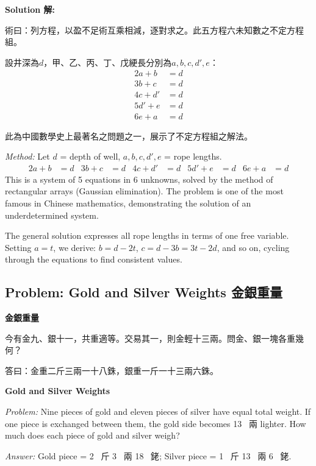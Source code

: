 \documentclass[11pt,a4paper]{article}
\newcommand{\zh}[1]{{\CJKfamily{\CJKrmdefault} #1}}
\newenvironment{chside}{%
  \begin{minipage}[t]{0.48\textwidth}%
  \setlength{\parindent}{1.5em}%
  \linespread{1.25}\selectfont%
  \small%
}{%
  \end{minipage}%
}
\newenvironment{enside}{%
  \hfill\begin{minipage}[t]{0.48\textwidth}%
  \setlength{\parindent}{1em}%
  \linespread{1.15}\selectfont%
  \small%
}{%
  \end{minipage}%
}
\newenvironment{solution}{%
  \par\medskip\noindent\textbf{\textcolor{notecolor}{Solution \zh{解}:}}\par\nopagebreak
  \small\setlength{\parindent}{1em}%
}{%
  \par\medskip%
}
\begin{document}
\begin{solution}
\noindent\begin{chside}
\zh{術曰：列方程，以盈不足術互乘相減，逐對求之。此五方程六未知數之不定方程組。}

設井深為$d$，甲、乙、丙、丁、戊綆長分別為$a, b, c, d', e$：
\begin{align*}
2a + b &= d \\
3b + c &= d \\
4c + d' &= d \\
5d' + e &= d \\
6e + a &= d
\end{align*}

此為中國數學史上最著名之問題之一，展示了不定方程組之解法。
\end{chside}%
\begin{enside}
\textit{Method:} Let $d$ = depth of well, $a, b, c, d', e$ = rope lengths.
\begin{align*}
2a + b &= d & 3b + c &= d & 4c + d' &= d & 5d' + e &= d & 6e + a &= d
\end{align*}
This is a system of 5 equations in 6 unknowns, solved by the method of
rectangular arrays (Gaussian elimination). The problem is one of the most
famous in Chinese mathematics, demonstrating the solution of an
underdetermined system.

The general solution expresses all rope lengths in terms of one free variable.
Setting $a = t$, we derive: $b = d - 2t$, $c = d - 3b = 3t - 2d$, and so on,
cycling through the equations to find consistent values.
\end{enside}
\end{solution}

\subsection{Problem: Gold and Silver Weights \zh{金銀重量}}

\noindent\begin{chside}
\noindent\textbf{金銀重量}

\zh{今有金九、銀十一，共重適等。交易其一，則金輕十三兩。問金、銀一塊各重幾何？}

\medskip
\zh{答曰：金重二斤三兩一十八銖，銀重一斤一十三兩六銖。}
\end{chside}%
\begin{enside}
\noindent\textbf{Gold and Silver Weights}

\textit{Problem:} Nine pieces of gold and eleven pieces of silver have equal
total weight. If one piece is exchanged between them, the gold side becomes
13~\zh{兩} lighter. How much does each piece of gold and silver weigh?

\medskip
\textit{Answer:} Gold piece = 2~\zh{斤} 3~\zh{兩} 18~\zh{銠}; Silver piece = 1~\zh{斤} 13~\zh{兩} 6~\zh{銠}.
\end{enside}
\end{document}
